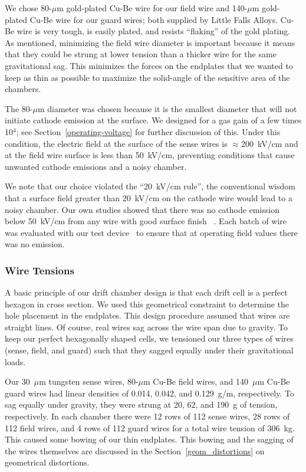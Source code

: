 We chose 80-$\mu$m gold-plated Cu-Be wire for our field wire and
140-$\mu$m gold-plated Cu-Be wire for our guard wires; both supplied
by Little Falls Alloys. Cu-Be wire is very tough, is easily plated, and resists
``flaking'' of the gold plating. 
As mentioned, minimizing the field wire diameter is important because it means that they 
could be strung at lower tension than a thicker wire for the same gravitational sag.  
This minimizes the forces on the endplates that we wanted to keep as 
thin as possible to maximize the solid-angle of the sensitive area of
the chambers.

The 80-$\mu$m diameter was chosen because it is the smallest diameter
that will not initiate cathode emission at the surface.
We designed for a gas gain of a few times 
10$^4$; see Section~\ref{operating-voltage} for further discussion of this. 
Under this condition, the electric field at the surface of the sense 
wires is $\approx$200~kV/cm and at the field wire
surface is less than 50~kV/cm, preventing 
conditions that cause unwanted cathode emissions and a noisy chamber.  

We note that our choice violated the ``20~kV/cm rule'', the conventional wisdom that
a surface field greater than 20~kV/cm on the cathode wire would lead to 
a noisy chamber. Our own studies showed that there was no cathode emission below
50~kV/cm from any wire with good surface finish~\cite{cathode-emission} .  Each batch
of wire was evaluated with our test device~\cite{patent} to ensure that at operating field 
values there was no emission.  

\subsubsection{Wire Tensions}

A basic principle of our drift chamber design is that each drift cell is a perfect hexagon
in cross section.
We used this geometrical constraint to determine the hole placement in the endplates.
This design procedure assumed that wires are straight lines.  Of course, real wires
sag across the wire span due to gravity.  To keep our perfect hexagonally shaped cells,
we tensioned our three types of wires (sense, field, and guard) such that they
sagged equally under their gravitational loads.

Our 30~$\mu$m tungsten sense wires, 80-$\mu$m Cu-Be field wires, and 140~$\mu$m Cu-Be guard
wires had linear densities of 0.014, 0.042, and 0.129~g/m, respectively.  To sag equally
under gravity, they were strung at 20, 62, and 190~g of tension, respectively.
In each chamber there were 12 rows of 112 sense wires, 28 rows of 112 field wires,
and 4 rows of 112 guard wires for a total wire tension of 306~kg.
This caused some bowing of our thin endplates. This bowing and the sagging
of the wires themselves are discussed in the Section~\ref{geom_distortions} on geometrical distortions.

